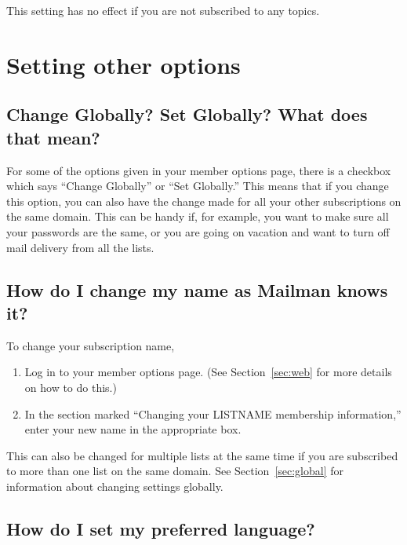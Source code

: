 \documentclass{howto}
\begin{document}
This setting has no effect if you are not subscribed to any topics.

\section{Setting other options}

\subsection{Change Globally?  Set Globally? What does that mean?
	\label{sec:global}}

For some of the options given in your member options page, there is a 
checkbox which says ``Change Globally'' or ``Set Globally.''  
This means that if you change this
option, you can also have the change made for all your other 
subscriptions on the same domain.  
This can be handy if, for example, you 
want to make sure all your passwords are the same, or you are going on 
vacation and want to turn off mail delivery from all the lists.

\subsection{How do I change my name as Mailman knows it?
	\label{sec:changename}}

To change your subscription name, 
\begin{enumerate}
	\item Log in to your member options page.  (See Section~\ref{sec:web} 
	for more details on how to do this.)
	\item In the section marked ``Changing your LISTNAME membership information,''
	enter your new name in the appropriate box.
\end{enumerate}

This can also be changed for multiple lists at the same time if you are subscribed to 
more than one list on the same domain.  See Section~\ref{sec:global} for 
information about changing settings globally.


\subsection{How do I set my preferred language?}
\end{document}
